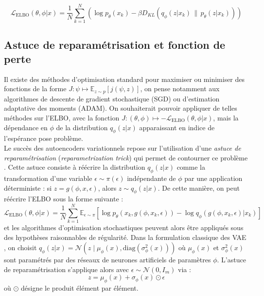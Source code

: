 \documentclass{article}
\begin{document}
        \begin{equation}
            \label{eq:beta_ELBO}
            \mathcal L_{\mathrm{ELBO}}(\theta, \phi | x) =\frac{1}{N}\sum_{k = 1}^N \left( \log p_\theta(x_k) - \beta D_{KL}(q_\phi(z|x_k)\,\|\,p_\theta(z|x_k))\right)
        \end{equation}
        

    \subsection{Astuce de reparamétrisation et fonction de perte}
        
        Il existe des méthodes d'optimisation standard pour maximiser ou minimiser des fonctions de la forme $J: \psi \mapsto \mathbb{E}_{z \sim p}[j(\psi,z)]$, on pense notamment aux algorithmes de descente de gradient stochastique (SGD) ou d'estimation adaptative des moments (ADAM). On souhaiterait pouvoir appliquer de telles méthodes sur l'ELBO, avec la fonction $J: (\theta, \phi) \mapsto - \mathcal{L}_{\mathrm{ELBO}}(\theta, \phi | x)$, mais la dépendance en $\phi$ de la distribution $q_\phi(z | x)$ apparaissant en indice de l'espérance pose problème.\\

        Le succès des autoencoders variationnels repose sur l'utilisation d'une \textit{astuce de reparamétrisation} (\textit{reparametrization trick}) qui permet de contourner ce problème \cite{kingmaAutoEncodingVariationalBayes2022}. Cette astuce consiste à réécrire la distribution $q_\phi(z|x)$ comme la transformation d'une variable $\epsilon \sim \pi(\epsilon)$ indépendante de $\phi$ par une application déterministe : si $z = g(\phi, x, \epsilon)$, alors $z \sim q_\phi(z | x)$. De cette manière, on peut réécrire l'ELBO sous la forme suivante :
                \begin{equation}
                    \mathcal{L}_{\mathrm{ELBO}}(\theta, \phi |x) = \frac{1}{N}\sum_{k = 1}^N\mathbb{E}_{\epsilon \sim \pi} \left[ \log p_\theta(x_k, g(\phi, x_k, \epsilon)) - \log q_\phi(g(\phi, x_k, \epsilon) | x_k) \right]
                \end{equation}
        et les algorithmes d'optimisation stochastiques peuvent alors être appliqués sous des hypothèses raisonnables de régularité. Dans la formulation classique des VAE \cite{kingmaAutoEncodingVariationalBayes2022}, on choisit $q_\phi(z|x) = \mathcal{N}(z \mid \mu_\phi(x), \mathrm{diag}(\sigma^2_\phi(x)))$ où $\mu_\phi(x)$ et $\sigma^2_\phi(x)$ sont paramétrés par des réseaux de neurones artificiels de paramètres $\phi$. L'astuce de reparamétrisation s'applique alors avec $\epsilon \sim \mathcal N(0, I_m)$ via :
                \begin{equation}
                    z = \mu_\phi(x) + \sigma_\phi(x) \odot \epsilon
                \end{equation}
        où $\odot$ désigne le produit élément par élément.
\end{document}
